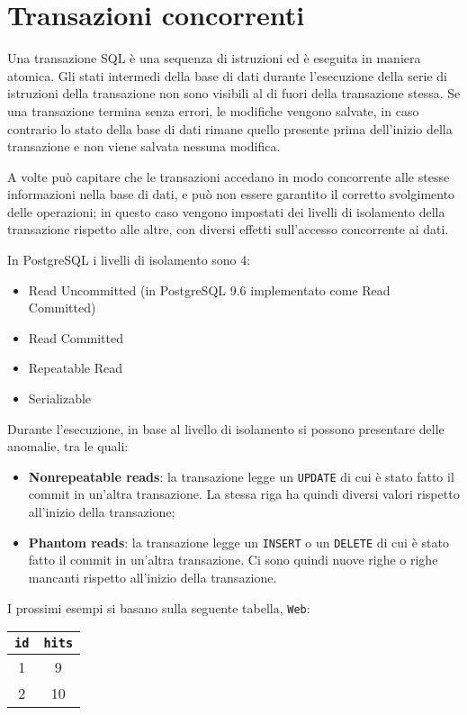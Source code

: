 \documentclass[a4paper, 10pt, titlepage]{article}
\begin{document}
	\newpage
	
		\section{Transazioni concorrenti}
	Una transazione SQL è una sequenza di istruzioni ed è eseguita in maniera atomica.
	Gli stati intermedi della base di dati durante l'esecuzione della serie di istruzioni della transazione non sono visibili al di fuori della transazione stessa.
	Se una transazione termina senza errori, le modifiche vengono salvate, in caso contrario lo stato della base di dati rimane quello presente prima dell'inizio della transazione e non viene salvata nessuna modifica.
	
	A volte può capitare che le transazioni accedano in modo concorrente alle stesse informazioni nella base di dati, e può non essere garantito il corretto svolgimento delle operazioni; in questo caso vengono impostati dei livelli di isolamento della transazione rispetto alle altre, con diversi effetti sull'accesso concorrente ai dati.
	
	In PostgreSQL i livelli di isolamento sono 4:
		\begin{itemize}
			\item Read Uncommitted (in PostgreSQL 9.6 implementato come Read Committed)
			\item Read Committed
			\item Repeatable Read
			\item Serializable	
		\end{itemize}
		Durante l'esecuzione, in base al livello di isolamento si possono presentare delle anomalie, tra le quali:
		\begin{itemize}
		\item \textbf{Nonrepeatable reads}: la transazione legge un \lstinline|UPDATE| di cui è stato fatto il commit in un'altra transazione. La stessa riga ha quindi diversi valori rispetto all'inizio della transazione;
		\item \textbf{Phantom reads}: la transazione legge un \lstinline|INSERT| o un \lstinline|DELETE| di cui è stato fatto il commit in un'altra transazione. Ci sono quindi nuove righe o righe mancanti rispetto all'inizio della transazione.
		\end{itemize}\medskip
		I prossimi esempi si basano sulla seguente tabella, 
		\lstinline|Web|: \qquad
		\begin{tabular}{cc}
			\toprule
			\lstinline|id| & \lstinline|hits| \\
			\midrule
			1 & 9 \\
			2 & 10 \\
			\midrule
		\end{tabular}
\end{document}
